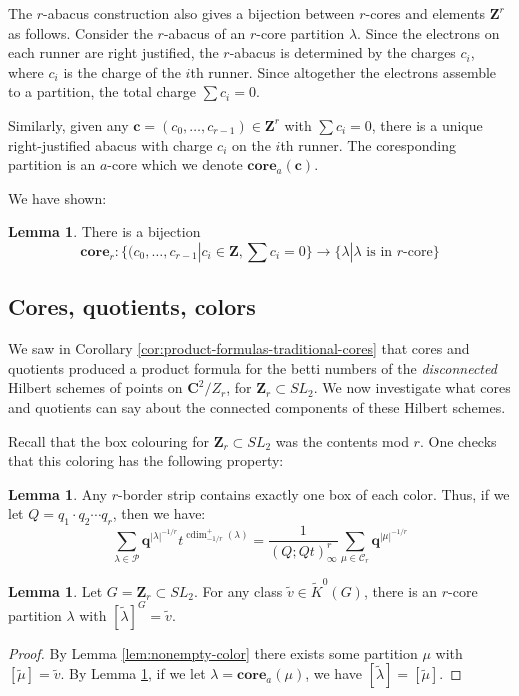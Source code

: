 \documentclass{amsart}[12pt]
\theoremstyle{definition}
\newtheorem{lemma}[dummy]{Lemma}
\newcommand{\Z}{\mathbf{Z}}
\newcommand{\C}{\mathbf{C}}
\newcommand{\PP}{\mathcal{P}} %
\newcommand{\core}{\mathbf{core}}
\newcommand{\cores}{\mathcal{C}}
\DeclareMathOperator{\cdim}{cdim}
\begin{document}
The $r$-abacus construction also gives a bijection between $r$-cores and elements $\Z^r$ as follows.  Consider the $r$-abacus of an $r$-core partition $\lambda$.  Since the electrons on each runner are right justified, the $r$-abacus is determined by the charges $c_i$, where $c_i$ is the charge of the $i$th runner.  Since altogether the electrons assemble to a partition, the total charge $\sum c_i=0$.  

Similarly, given any $\mathbf{c}=(c_0,\dots,c_{r-1})\in\Z^r$ with $\sum c_i=0$, there is a unique right-justified abacus with charge $c_i$ on the $i$th runner.  The coresponding partition is an $a$-core which we denote $\core_a(\mathbf{c})$.

We have shown:
\begin{lemma}
There is a bijection $$\core_r:\{(c_0,\dots,c_{r-1}|c_i\in\Z, \sum c_i=0\}\to \{\lambda | \lambda \text{ is in $r$-core} \}$$
\end{lemma}


\subsection{Cores, quotients, colors}

We saw in Corollary \ref{cor:product-formulas-traditional-cores} that cores and quotients produced a product formula for the betti numbers of the \emph{disconnected} Hilbert schemes of points on $\C^2/Z_r$, for $\Z_r\subset SL_2$.  We now investigate what cores and quotients can say about the connected components of these Hilbert schemes.

Recall that the box colouring for $\Z_r\subset SL_2$ was the contents mod $r$.  One checks that this coloring has the following property:
\begin{lemma} \label{lem:stripcolor}
Any $r$-border strip contains exactly one box of each color.  Thus, if we let $Q=q_1\cdot q_2\cdots q_r$, then we have:
  $$\sum_{\lambda\in\PP} \mathbf{q}^{|\lambda|^{-1/r}} t^{\cdim^+_{-1/r}(\lambda)}=\frac{1}{(Q;Qt)^r_\infty}\sum_{\mu\in\cores_r} \mathbf{q}^{|\mu|^{-1/r}}$$
\end{lemma}


\begin{lemma} \label{lem:colored-core-existence}
Let $G=\Z_r\subset SL_2$.    For any class $\widetilde{v}\in \widetilde{K}^0(G)$, there is an $r$-core partition $\lambda$ with $[\widetilde{\lambda}]^G=\widetilde{v}$.
\end{lemma}

\begin{proof}
By Lemma \ref{lem:nonempty-color} there exists some partition $\mu$ with $[\widetilde{\mu}]=\widetilde{v}$.  By Lemma \ref{lem:stripcolor}, if we let $\lambda=\core_a(\mu)$, we have $[\widetilde{\lambda}]=[\widetilde{\mu}]$.
\end{proof}
\end{document}
